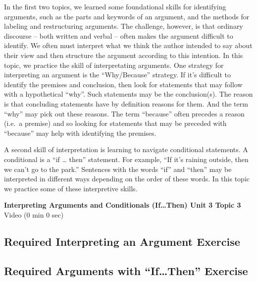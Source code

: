 \documentclass[
]{book}
\begin{document}
In the first two topics, we learned some foundational skills for identifying arguments, such as the parts and keywords of an argument, and the methods for labeling and restructuring arguments. The challenge, however, is that ordinary discourse -- both written and verbal -- often makes the argument difficult to identify. We often must interpret what we think the author intended to say about their view and then structure the argument according to this intention. In this topic, we practice the skill of interpretating arguments. One strategy for interpreting an argument is the ``Why/Because'' strategy. If it's difficult to identify the premises and conclusion, then look for statements that may follow with a hypothetical ``why''. Such statements may be the conclusion(s). The reason is that concluding statements have by definition reasons for them. And the term ``why'' may pick out these reasons. The term ``because'' often precedes a reason (i.e.~a premise) and so looking for statements that may be preceded with ``because'' may help with identifying the premises.

A second skill of interpretation is learning to navigate conditional statements. A conditional is a ``if \ldots{} then'' statement. For example, ``If it's raining outside, then we can't go to the park.'' Sentences with the words ``if'' and ``then'' may be interpreted in different ways depending on the order of these words. In this topic we practice some of these interpretive skills.

\textbf{Interpreting Arguments and Conditionals (If\ldots Then) Unit 3 Topic 3} Video (0 min 0 sec)

\hypertarget{required-interpreting-an-argument-exercise}{%
\subsection*{Required Interpreting an Argument Exercise}\label{required-interpreting-an-argument-exercise}}

\begin{reflect}
\end{reflect}

\hypertarget{required-arguments-with-ifthen-exercise}{%
\subsection*{Required Arguments with ``If\ldots Then'' Exercise}\label{required-arguments-with-ifthen-exercise}}
\end{document}
